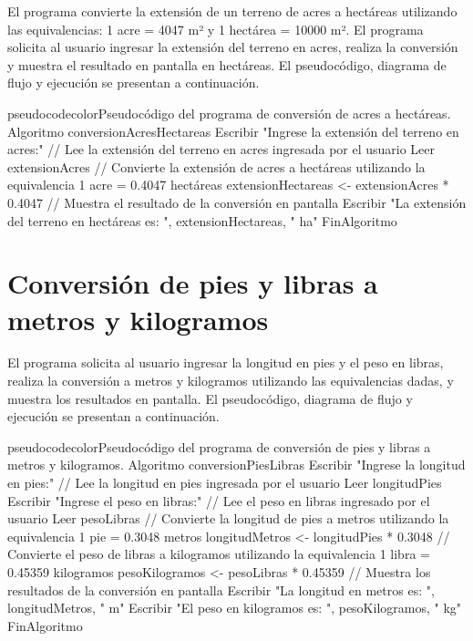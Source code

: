 \documentclass[
	spanish, %
	letterpaper, oneside
]{article}
\begin{document}
El programa convierte la extensión de un terreno de acres a hectáreas utilizando las equivalencias: 1 acre = 4047 m² y 1 hectárea = 10000 m². El programa solicita al usuario ingresar la extensión del terreno en acres, realiza la conversión y muestra el resultado en pantalla en hectáreas. El pseudocódigo, diagrama de flujo y ejecución se presentan a continuación.

\begin{sourcecode}{pseudocodecolor}{Pseudocódigo del programa de conversión de acres a hectáreas.}
Algoritmo conversionAcresHectareas
    Escribir "Ingrese la extensión del terreno en acres:"
    // Lee la extensión del terreno en acres ingresada por el usuario
    Leer extensionAcres
    // Convierte la extensión de acres a hectáreas utilizando la equivalencia 1 acre = 0.4047 hectáreas
    extensionHectareas <- extensionAcres * 0.4047
    // Muestra el resultado de la conversión en pantalla
    Escribir "La extensión del terreno en hectáreas es: ", extensionHectareas, " ha"
FinAlgoritmo
\end{sourcecode}


%
\section{Conversión de pies y libras a metros y kilogramos}

El programa solicita al usuario ingresar la longitud en pies y el peso en libras, realiza la conversión a metros y kilogramos utilizando las equivalencias dadas, y muestra los resultados en pantalla. El pseudocódigo, diagrama de flujo y ejecución se presentan a continuación.

\begin{sourcecode}{pseudocodecolor}{Pseudocódigo del programa de conversión de pies y libras a metros y kilogramos.}
Algoritmo conversionPiesLibras
    Escribir "Ingrese la longitud en pies:"
    // Lee la longitud en pies ingresada por el usuario
    Leer longitudPies
    Escribir "Ingrese el peso en libras:"
    // Lee el peso en libras ingresado por el usuario
    Leer pesoLibras
    // Convierte la longitud de pies a metros utilizando la equivalencia 1 pie = 0.3048 metros
    longitudMetros <- longitudPies * 0.3048
    // Convierte el peso de libras a kilogramos utilizando la equivalencia 1 libra = 0.45359 kilogramos
    pesoKilogramos <- pesoLibras * 0.45359
    // Muestra los resultados de la conversión en pantalla
    Escribir "La longitud en metros es: ", longitudMetros, " m"
    Escribir "El peso en kilogramos es: ", pesoKilogramos, " kg"
FinAlgoritmo
\end{sourcecode}
\end{document}
